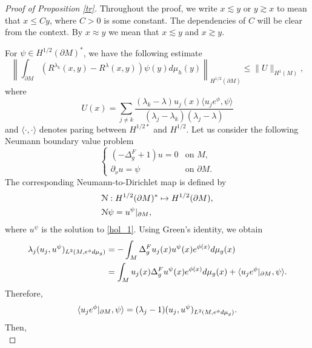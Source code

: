 \documentclass[12pt,a4paper]{amsart}
\numberwithin{equation}{section}
\theoremstyle{plain}
\theoremstyle{definition}
\begin{document}
\begin{proof}[Proof of Proposition \ref{tr}]
Throughout the proof, we write $x\lesssim y$ or $y\gtrsim x$ to mean that $x\leq Cy$, where $C >0$ is some constant.
The dependencies of $C$ will be clear from the context. By $x\approx y$ we mean that $x\lesssim y$ and $x\gtrsim y$.

    For $\psi\in H^{1/2}(\partial M)^*$, we have the following estimate
    \begin{equation*}
			\left\| \int_{\partial M} (R^{\lambda_k}(x,y) - R^\lambda(x,y))\psi(y)d\mu_h(y)\right\|_{H^{1/2}(\partial M)} \leq \|U\|_{H^1(M)},
    \end{equation*}
		where
    \begin{equation*}
			U(x) = \sum_{j\neq k} \frac{(\lambda_k - \lambda)u_j(x)\langle u_je^\phi,\psi\rangle}{(\lambda_j - \lambda_k)(\lambda_j - \lambda)}
    \end{equation*}
    and $\langle \cdot,\cdot \rangle$ denotes paring between $H^{1/2*}$ and $H^{1/2}$. Let us consider the following Neumann boundary value problem
    \begin{equation}\label{hol_1}
			\begin{cases}
				(-\Delta_g^F + 1)u=0 & \text{on } M,\\
				\partial_\nu u = \psi & \text{on } \partial M.
			\end{cases}
    \end{equation}
    The corresponding Neumann-to-Dirichlet map is defined by
    \begin{align*}
			& \mathcal{N}: H^{1/2}(\partial M)^* \mapsto H^{1/2}(\partial M),\\
			& \mathcal{N}\psi = u^{\psi}\arrowvert_{\partial M},
    \end{align*} 
    where $u^\psi$ is the solution to \eqref{hol_1}. Using Green's identity, we obtain 
    \begin{align*}
        \lambda_j(u_j,u^\psi)_{L^2(M,e^\phi d\mu_g)} &= - \int_M \Delta_g^Fu_j(x) u^\psi(x) e^{\phi(x)} d\mu_g(x)\\
        &= \int_M u_j(x) \Delta_g^Fu^\psi(x) e^{\phi(x)} d\mu_g(x) + \langle u_je^\phi\arrowvert_{\partial M}, \psi\rangle.
    \end{align*}
    Therefore,
    \begin{equation*}
        \langle u_je^\phi\arrowvert_{\partial M}, \psi\rangle = (\lambda_j - 1) (u_j,u^\psi)_{L^2(M,e^\phi d\mu_g)}.
    \end{equation*}
    Then,
    \begin{equation*}

\end{equation*}
\end{proof}
\end{document}
